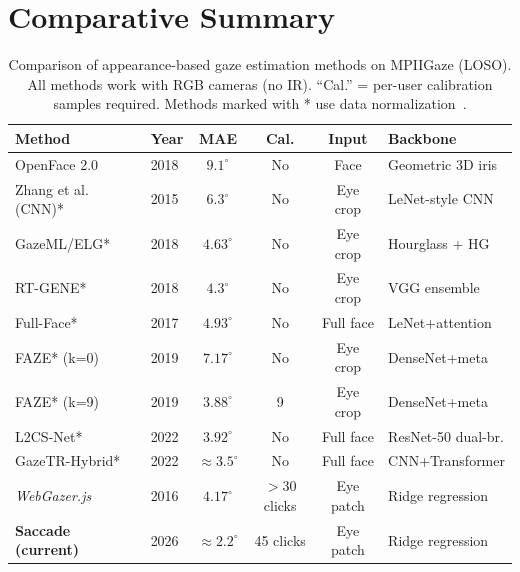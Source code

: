 \documentclass[11pt,a4paper]{article}
\begin{document}
\section{Comparative Summary}
\label{sec:comparison}

\begin{table}[H]
  \centering
  \caption{Comparison of appearance-based gaze estimation methods on MPIIGaze (LOSO). All methods work with RGB cameras (no IR). ``Cal.'' = per-user calibration samples required. Methods marked with * use data normalization~\cite{zhang2018revisiting}.}
  \small
  \setlength{\tabcolsep}{4pt}
  \begin{tabular}{llcccl}
    \toprule
    \textbf{Method} & \textbf{Year} & \textbf{MAE} & \textbf{Cal.} & \textbf{Input} & \textbf{Backbone} \\
    \midrule
    OpenFace 2.0~\cite{baltrusaitis2018openface}  & 2018 & $9.1^\circ$ & No  & Face      & Geometric 3D iris \\
    Zhang et al. (CNN)*~\cite{zhang2015appearance}& 2015 & $6.3^\circ$ & No  & Eye crop  & LeNet-style CNN \\
    GazeML/ELG*~\cite{park2018learning}           & 2018 & $4.63^\circ$& No  & Eye crop  & Hourglass + HG \\
    RT-GENE*~\cite{fischer2018rtgene}              & 2018 & $4.3^\circ$ & No  & Eye crop  & VGG ensemble \\
    Full-Face*~\cite{zhang2017written}             & 2017 & $4.93^\circ$& No  & Full face & LeNet+attention \\
    FAZE* (k=0)~\cite{park2019faze}                & 2019 & $7.17^\circ$& No  & Eye crop  & DenseNet+meta \\
    FAZE* (k=9)~\cite{park2019faze}                & 2019 & $3.88^\circ$& 9   & Eye crop  & DenseNet+meta \\
    L2CS-Net*~\cite{abdelrahman2022l2cs}           & 2022 & $3.92^\circ$& No  & Full face & ResNet-50 dual-br. \\
    GazeTR-Hybrid*~\cite{cheng2022gazetr}          & 2022 & ${\approx}3.5^\circ$ & No & Full face & CNN+Transformer \\
    \midrule
    \textit{WebGazer.js}~\cite{papoutsaki2016webgazer} & 2016 & $4.17^\circ$ & $>$30 clicks & Eye patch & Ridge regression \\
    \textbf{Saccade (current)}                    & 2026 & ${\approx}2.2^\circ$ & 45 clicks & Eye patch & Ridge regression \\
    \bottomrule
  \end{tabular}
  \label{tab:comparison}
\end{table}
\end{document}
